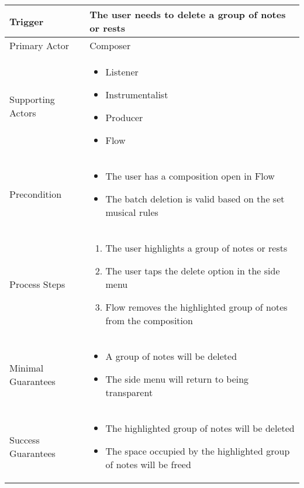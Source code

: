 \begin{longtable}{|X|X|}
\hline
Trigger & 
The user needs to delete a group of notes or rests \\
\hline
Primary Actor & 
Composer \\
\hline
Supporting Actors & 
\begin{itemize}
\item Listener
\item Instrumentalist
\item Producer
\item Flow
\end{itemize} \\
\hline
Precondition & 
\begin{itemize}
\item The user has a composition open in Flow
\item The batch deletion is valid based on the set musical rules
\end{itemize} \\
\hline
Process Steps & 
\begin{enumerate}
\item The user highlights a group of notes or rests
\item The user taps the delete option in the side menu
\item Flow removes the highlighted group of notes from the composition
\end{enumerate} \\
\hline
Minimal Guarantees & 
\begin{itemize}
  \item A group of notes will be deleted
  \item The side menu will return to being transparent
\end{itemize} \\
\hline
Success Guarantees & 
\begin{itemize}
  \item The highlighted group of notes will be deleted 
  \item The space occupied by the highlighted group of notes will be freed
\end{itemize} \\
\hline
\end{longtable}